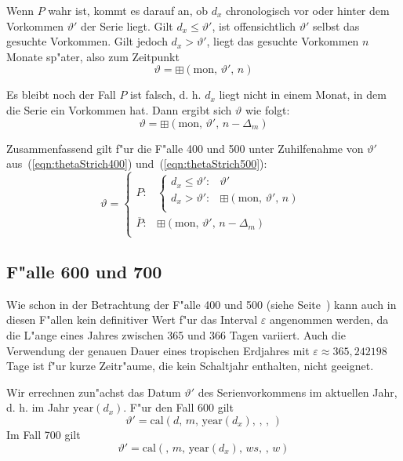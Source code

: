 \documentclass[a4paper]{article}
\newcommand*{\monf}{\mathrm{mon}}
\newcommand*{\yearf}{\mathrm{year}}
\newcommand*{\calf}{\mathrm{cal}}
\newcommand*{\addff}{\boxplus}
\numberwithin{equation}{section}
\begin{document}
Wenn $P$ wahr ist, kommt es darauf an, ob $d_x$ chronologisch vor oder hinter
dem Vorkommen $\vartheta'$ der Serie liegt. Gilt $d_x \le \vartheta'$, ist
offensichtlich $\vartheta'$ selbst das gesuchte Vorkommen. Gilt jedoch
$d_x > \vartheta'$, liegt das gesuchte Vorkommen $n$ Monate sp"ater, also zum
Zeitpunkt
\begin{equation*}\vartheta = \addff(\monf,\,\vartheta',\,n)\end{equation*}

Es bleibt noch der Fall $P$ ist falsch, d. h. $d_x$ liegt nicht in einem Monat,
in dem die Serie ein Vorkommen hat.
Dann ergibt sich $\vartheta$ wie folgt:
\begin{equation}\vartheta = \addff(\monf,\,\vartheta',\,n-\Delta_m)\end{equation}

\noindent Zusammenfassend gilt f"ur die F"alle 400 und 500 unter Zuhilfenahme
von $\vartheta'$ aus~(\ref{eqn:thetaStrich400}) und~(\ref{eqn:thetaStrich500}):
\begin{equation}\label{eqn:theta400}
  \vartheta = \left\{\begin{array}{ll}
  P : & \left\{\begin{array}{ll}
    d_x \le \vartheta' : & \vartheta' \\
    d_x > \vartheta' : & \addff(\monf,\,\vartheta',\,n) \\
    \end{array}\right. \\
  \overline{P} : & \addff(\monf,\,\vartheta',\,n-\Delta_m) \\
  \end{array}\right.
\end{equation}


%
%
\subsection{F"alle 600 und 700}
Wie schon in der Betrachtung der F"alle 400 und 500 (siehe
Seite~\pageref{ssec:approx400_500}) kann auch in diesen F"allen kein definitiver
Wert f"ur das Interval $\varepsilon$ angenommen werden, da die L"ange eines
Jahres zwischen 365 und 366 Tagen variiert. Auch die Verwendung der genauen
Dauer eines tropischen Erdjahres mit $\varepsilon \approx 365,242198$ Tage ist
f"ur kurze Zeitr"aume, die kein Schaltjahr enthalten, nicht geeignet.

Wir errechnen zun"achst das Datum $\vartheta'$ des Serienvorkommens im aktuellen
Jahr, d. h. im Jahr $\yearf(d_x)$. F"ur den Fall 600 gilt
\begin{equation}\vartheta' = \calf(d,\,m,\,\yearf(d_x),\,,\,,\,)\end{equation}
Im Fall 700 gilt
\begin{equation}\vartheta' = \calf(,\,m,\,\yearf(d_x),\,ws,\,,\,w)\end{equation}
\end{document}
